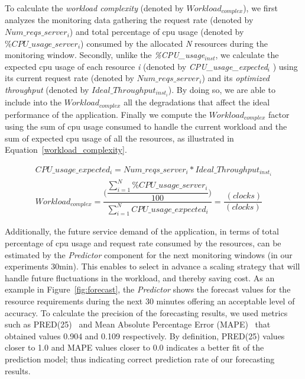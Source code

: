 To calculate the \emph{workload complexity} (denoted by \emph{$Workload_{complex}$}), we first analyzes the monitoring data gathering the request rate (denoted by $Num\_reqs\_server_{i}$) and total percentage of cpu usage (denoted by \emph{$\%CPU\_usage\_server_{i}$}) consumed by the allocated \emph{N} resources during the monitoring window. Secondly, unlike the \emph{\%CPU\_usage$_{inst}$},  we calculate the expected cpu usage of each resource \emph{i} (denoted by \emph{CPU\_usage\_expected$_{i}$} ) using its current request rate (denoted by $Num\_reqs\_server_{i}$) and its \emph{optimized throughput} (denoted by $Ideal\_Throughput_{inst_{i}}$). By doing so, we are able to include into the \emph{$Workload_{complex}$} all the degradations that affect the ideal performance of the application. Finally we compute the \emph{$Workload_{complex}$} factor using the sum of cpu usage consumed to handle the current workload and the sum of expected cpu usage of all the resources, as illustrated in Equation~\ref{workload_complexity}.



{\scriptsize
\begin{equation}\label{workload_complexity}
\begin{split}
CPU\_usage\_expected_{i} =  Num\_reqs\_server_{i}  * Ideal\_Throughput_{inst_{i}} \\
Workload_{complex}  = \dfrac{ \bigg(  \dfrac{ \sum_{i=1}^N \%CPU\_usage\_server_{i} } {100} \bigg) }  {  \sum_{i=1}^N  CPU\_usage\_expected_{i}     } = \dfrac{ \ (clocks) }  {  (clocks) }
\end{split}
\end{equation}
}

Additionally, the future service demand of the application, in terms of total percentage of cpu usage and request rate consumed by the resources, can be estimated by the \emph{Predictor} component for the next monitoring windows (in our experiments 30min). This enables to select in advance a scaling strategy that will handle future fluctuations in the workload, and thereby saving cost. As an example in Figure~\ref{fig:forecast}, the \emph{Predictor} shows the forecast values for the resource requirements during the next 30 minutes offering an acceptable level of accuracy. To calculate the precision of the forecasting results, we used metrics such as PRED(25)~\cite{jorgensen_experience_1995} and Mean Absolute Percentage Error (MAPE)~\cite{islam_empirical_2012} that obtained values 0.904 and 0.109 respectively. By definition, PRED(25) values closer to 1.0 and MAPE values closer to 0.0 indicates a better fit of the prediction model; thus indicating correct prediction rate of our forecasting results.

